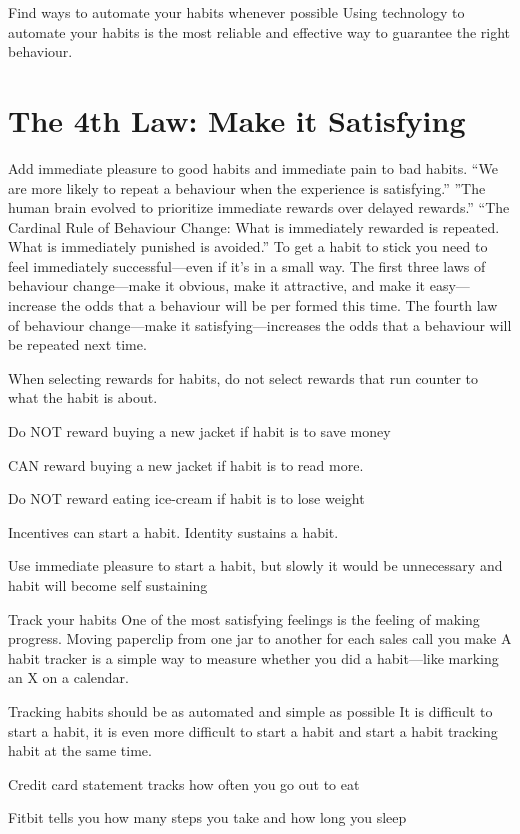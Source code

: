\documentclass[10pt,twocolumn]{../notes}
\begin{document}
\Advice Find ways to automate your habits whenever possible
\Quote Using technology to automate your habits is the most reliable and effective way to guarantee the right behaviour.

\section{The 4th Law: Make it Satisfying}

\Advice Add immediate pleasure to good habits and immediate pain to bad habits.
\Fact “We are more likely to repeat a behaviour when the experience is satisfying.”
\Fact ”The human brain evolved to prioritize immediate rewards over delayed rewards.”
\Fact “The Cardinal Rule of Behaviour Change: What is immediately rewarded is repeated. What is immediately punished is avoided.”
\Quote To get a habit to stick you need to feel immediately successful—even if it’s in a small way.
\Quote The first three laws of behaviour change—make it obvious, make it attractive, and make it easy—increase the odds that a behaviour will be per formed this time. The fourth law of behaviour change—make it satisfying—increases the odds that a behaviour will be repeated next time.

\Advice When selecting rewards for habits, do not select rewards that run counter to what the habit is about.
\begin{Examplelist}{}
\item Do NOT reward buying a new jacket if habit is to save money
\item CAN reward buying a new jacket if habit is to read more.
\item Do NOT reward eating ice-cream if habit is to lose weight
\end{Examplelist}
\Quote Incentives can start a habit. Identity sustains a habit.

\Advice Use immediate pleasure to start a habit, but slowly it would be unnecessary and habit will become self sustaining

\Advice Track your habits
\Quote One of the most satisfying feelings is the feeling of making progress.
Moving paperclip from one jar to another for each sales call you make
\Quote A habit tracker is a simple way to measure whether you did a habit—like marking an X on a calendar.

\Advice Tracking habits should be as automated and simple as possible
\Fact It is difficult to start a habit, it is even more difficult to start a habit and start a habit tracking habit at the same time.
\begin{Examplelist}{}
  \item Credit card statement tracks how often you go out to eat
  \item Fitbit tells you how many steps you take and how long you sleep
\end{Examplelist}{}
\end{document}
